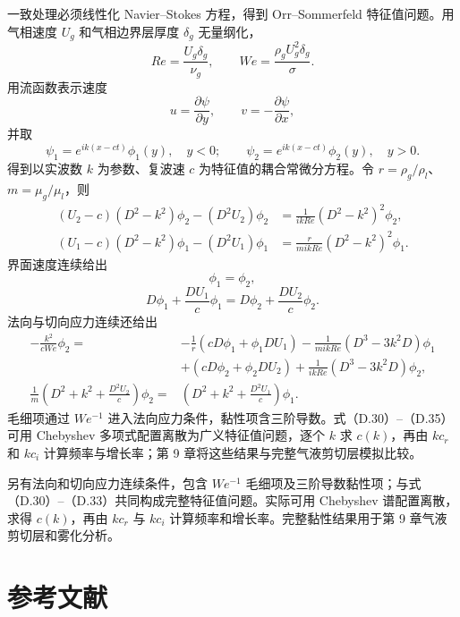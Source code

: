 \documentclass[11pt,a4paper,openany,fontset=none]{ctexbook}
\begin{document}
一致处理必须线性化 Navier--Stokes 方程，得到 Orr--Sommerfeld 特征值问题。用气相速度 $U_g$ 和气相边界层厚度 $\delta_g$ 无量纲化，
\begin{equation*}
 Re=\frac{U_g\delta_g}{\nu_g},\qquad
 We=\frac{\rho_gU_g^2\delta_g}{\sigma}.
\end{equation*}
用流函数表示速度
\begin{equation}
 u=\frac{\partial\psi}{\partial y},\qquad
 v=-\frac{\partial\psi}{\partial x}, \tag{D.27}
\end{equation}
并取
\begin{equation}
 \psi_1=e^{ik(x-ct)}\phi_1(y),\quad y<0;\qquad
 \psi_2=e^{ik(x-ct)}\phi_2(y),\quad y>0. \tag{D.28--D.29}
\end{equation}
得到以实波数 $k$ 为参数、复波速 $c$ 为特征值的耦合常微分方程。令 $r=\rho_g/\rho_l$、$m=\mu_g/\mu_l$，则
\begin{align}
 (U_2-c)(D^2-k^2)\phi_2-(D^2U_2)\phi_2
 &=\frac1{ikRe}(D^2-k^2)^2\phi_2, \tag{D.30}\\
 (U_1-c)(D^2-k^2)\phi_1-(D^2U_1)\phi_1
 &=\frac{r}{mikRe}(D^2-k^2)^2\phi_1. \tag{D.31}
\end{align}
界面速度连续给出
\begin{equation}
 \phi_1=\phi_2, \tag{D.32}
\end{equation}
\begin{equation}
 D\phi_1+\frac{DU_1}{c}\phi_1
 =D\phi_2+\frac{DU_2}{c}\phi_2. \tag{D.33}
\end{equation}
法向与切向应力连续还给出
\begin{align}
 -\frac{k^2}{cWe}\phi_2={}&-\frac1r(cD\phi_1+\phi_1DU_1)
 -\frac{1}{mikRe}(D^3-3k^2D)\phi_1 \\
 &+(cD\phi_2+\phi_2DU_2)+\frac{1}{ikRe}(D^3-3k^2D)\phi_2, \tag{D.34}\\
 \frac1m\left(D^2+k^2+\frac{D^2U_2}{c}\right)\phi_2={}&
 \left(D^2+k^2+\frac{D^2U_1}{c}\right)\phi_1. \tag{D.35}
\end{align}
毛细项通过 $We^{-1}$ 进入法向应力条件，黏性项含三阶导数。式（D.30）--（D.35）可用 Chebyshev 多项式配置离散为广义特征值问题，逐个 $k$ 求 $c(k)$，再由 $kc_r$ 和 $kc_i$ 计算频率与增长率；第 9 章将这些结果与完整气液剪切层模拟比较。

另有法向和切向应力连续条件，包含 $We^{-1}$ 毛细项及三阶导数黏性项；与式（D.30）--（D.33）共同构成完整特征值问题。实际可用 Chebyshev 谱配置离散，求得 $c(k)$，再由 $kc_r$ 与 $kc_i$ 计算频率和增长率。完整黏性结果用于第 9 章气液剪切层和雾化分析。

\chapter*{参考文献}
\end{document}
